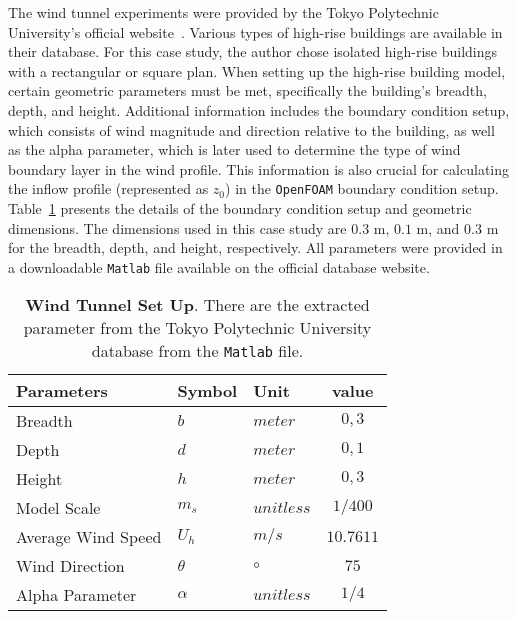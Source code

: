 \documentclass[12pt,a4paper]{cibb}
\begin{document}
The wind tunnel experiments were provided by the Tokyo Polytechnic University’s official website~\cite{TOKYO}. Various types of high-rise buildings are available in their database. For this case study, the author chose isolated high-rise buildings with a rectangular or square plan. When setting up the high-rise building model, certain geometric parameters must be met, specifically the building’s breadth, depth, and height. Additional information includes the boundary condition setup, which consists of wind magnitude and direction relative to the building, as well as the alpha parameter, which is later used to determine the type of wind boundary layer in the wind profile. This information is also crucial for calculating the inflow profile (represented as $z_0$) in the \texttt{OpenFOAM} boundary condition setup. Table~\ref{tab:windTunnelSetup} presents the details of the boundary condition setup and geometric dimensions. The dimensions used in this case study are $0.3$ m, $0.1$ m, and $0.3$ m for the breadth, depth, and height, respectively. All parameters were provided in a downloadable \texttt{Matlab} file available on the official database website.

\begin{table}[httb!] \small
\centering
    \begin{tabularx}{0.55\textwidth}{ l  l  l c }
        \toprule
          \textbf{Parameters} & \textbf{Symbol} & \textbf{Unit} & \textbf{value} \\
        \midrule
        Breadth & $b$ & $meter$ & $0,3$ \\
			Depth & $d$ & $meter$ & $0,1$ \\
			Height & $h$ & $meter$ & $0,3$\\
			Model Scale & $m_s$ & $unitless$ & $1/400$ \\
                Average Wind Speed & $U_h$ & $m/s$ & $10.7611$\\
			Wind Direction & $\theta$ & $\circ$ & $75$\\
			Alpha Parameter & $\alpha$ & $unitless$ & $1/4$ \\
        \bottomrule
    \end{tabularx}
    \caption{\textbf{Wind Tunnel Set Up}.
    There are the extracted parameter from the Tokyo Polytechnic University database from the \texttt{Matlab} file.\label{tab:windTunnelSetup}}
\end{table}
\end{document}
